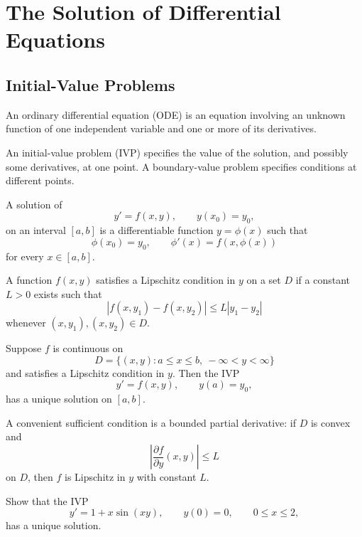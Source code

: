 \chapter{The Solution of Differential Equations}

\section{Initial-Value Problems}

\begin{definition}
An ordinary differential equation (ODE) is an equation involving an unknown function of one independent variable and one or more of its derivatives.
\end{definition}

An initial-value problem (IVP) specifies the value of the solution, and possibly some derivatives, at one point.  A boundary-value problem specifies conditions at different points.

\begin{definition}
A solution of
\[
 y'=f(x,y),
 \qquad y(x_0)=y_0,
\]
on an interval $[a,b]$ is a differentiable function $y=\phi(x)$ such that
\[
 \phi(x_0)=y_0,
 \qquad
 \phi'(x)=f(x,\phi(x))
\]
for every $x\in[a,b]$.
\end{definition}

\begin{definition}
A function $f(x,y)$ satisfies a Lipschitz condition in $y$ on a set $D$ if a constant $L>0$ exists such that
\[
 |f(x,y_1)-f(x,y_2)|\le L|y_1-y_2|
\]
whenever $(x,y_1),(x,y_2)\in D$.
\end{definition}

\begin{theorem}
Suppose $f$ is continuous on
\[
 D=\{(x,y):a\le x\le b,\ -\infty<y<\infty\}
\]
and satisfies a Lipschitz condition in $y$.  Then the IVP
\[
 y'=f(x,y),
 \qquad y(a)=y_0,
\]
has a unique solution on $[a,b]$.
\end{theorem}

A convenient sufficient condition is a bounded partial derivative:
if $D$ is convex and
\[
 \left|\frac{\partial f}{\partial y}(x,y)\right|\le L
\]
on $D$, then $f$ is Lipschitz in $y$ with constant $L$.

\begin{example}
Show that the IVP
\[
 y'=1+x\sin(xy),
 \qquad y(0)=0,
 \qquad0\le x\le2,
\]
has a unique solution.
\end{example}

